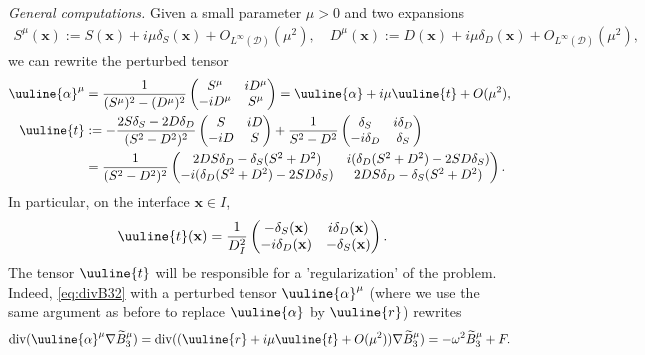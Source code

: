 \documentclass[report]{elsarticle}
\numberwithin{theorem}{section}
\renewcommand{\vec}[1]{\mathbf{#1}}
\begin{document}
\textit{General computations. }Given a small parameter $\mu>0$ and two expansions
\begin{align*}
	{S}^{\mu}(\vec{x}):=S(\vec{x})+i\mu\delta_S(\vec{x})+O_{L^{\infty}(\mathcal{D})}(\mu^2), \quad {D}^{\mu}(\vec{x}):=D(\vec{x})+i\mu \delta_D(\vec{x}) +O_{L^{\infty}(\mathcal{D})}(\mu^2),
\end{align*}
we can rewrite the perturbed tensor 
\begin{align}
\label{eq:perturbed_tensor}
	\uuline{\alpha}^{\mu}&=\frac{1}{(S^{\mu})^2-(D^{\mu})^2}\left(
	\begin{matrix}
		S^{\mu} & iD^{\mu}\\
		-iD^{\mu} & S^{\mu}
	\end{matrix}
\right)=\uuline{\alpha}+i\mu \uuline{t}+O(\mu^2),\\
\nonumber
\uuline{t}&:=-\frac{2S\delta_S-2D\delta_D}{(S^2-D^2)^2}\left(\begin{matrix}
	S & iD\\
	-iD & S
\end{matrix}\right)+\frac{1}{S^2-D^2}\left(
\begin{matrix}
	\delta_S & i\delta_D\\
	-i\delta_D & \delta_S
\end{matrix}
\right)\\
\label{eq:t_matrix_absorption}
&=\frac{1}{(S^2-D^2)^2}\left(
\begin{matrix}
2DS\delta_D-\delta_S(S^2+D^2) & i(\delta_D(S^2+D^2)-2SD\delta_S)\\
-i(\delta_D(S^2+D^2)-2SD\delta_S)&	2DS\delta_D-\delta_S(S^2+D^2)
\end{matrix}
\right).
\end{align}
In particular, on the interface $\vec{x}\in I$, 
\begin{align}
	\label{eq:tensorReg}
	\uuline{t}(\vec{x})&=\frac{1}{D^2_I}\left(
	\begin{matrix}
		-\delta_S(\vec{x}) & i\delta_D(\vec{x})\\
		-i\delta_D(\vec{x}) & -\delta_S(\vec{x})
	\end{matrix}
	\right).
\end{align}
The tensor $\uuline{t}$ will be responsible for a 'regularization' of the problem. Indeed, \eqref{eq:divB32} with a perturbed tensor $\uuline{\alpha}^{\mu}$ (where we use the same argument as before to replace $\uuline{\alpha}$ by $\uuline{r}$) rewrites  
\begin{align}
	\label{eq:divB3}
\operatorname{div}(\uuline{\alpha}^{\mu}\nabla \widetilde{B}_3^{\mu})=	\operatorname{div}((\uuline{r}+i\mu\uuline{t}+O(\mu^2))\nabla \widetilde{B}_3^{\mu})=-\omega^2 \widetilde{B}_3^{\mu}+F.
\end{align}
\end{document}
